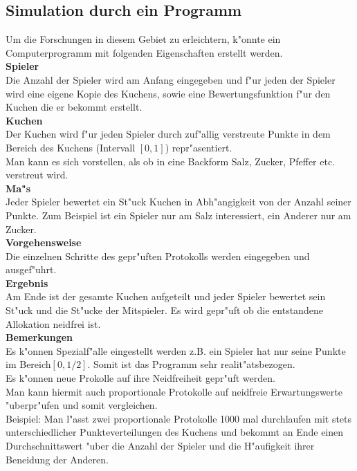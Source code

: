 \documentclass[11pt, a4paper, twoside]{article}
\numberwithin{equation}{section}
\begin{document}
\subsection{Simulation durch ein Programm}
Um die Forschungen in diesem Gebiet zu erleichtern, k"onnte ein Computerprogramm mit folgenden Eigenschaften erstellt werden.\\
\newline
\textbf{Spieler}\\
Die Anzahl der Spieler wird am Anfang eingegeben und f"ur jeden der Spieler wird eine eigene Kopie des Kuchens, sowie eine Bewertungsfunktion f"ur den Kuchen die er bekommt erstellt.\\
\newline
\textbf{Kuchen}\\
Der Kuchen wird f"ur jeden Spieler durch zuf"allig verstreute Punkte in dem Bereich des Kuchens (Intervall $[0,1]$) repr"asentiert.\\ Man kann es sich vorstellen, als ob in eine Backform Salz, Zucker, Pfeffer etc. verstreut wird.\\
\newline 
\textbf{Ma"s}\\
Jeder Spieler bewertet ein St"uck Kuchen in Abh"angigkeit von der Anzahl seiner Punkte. Zum Beispiel ist ein Spieler nur am Salz interessiert, ein Anderer nur am Zucker.\\ 
\newline
\textbf{Vorgehensweise}\\
Die einzelnen Schritte des gepr"uften Protokolls werden eingegeben und ausgef"uhrt.\\
\newline
\textbf{Ergebnis}\\
Am Ende ist der gesamte Kuchen aufgeteilt und jeder Spieler bewertet sein St"uck und die St"ucke der Mitspieler. Es wird gepr"uft ob die entstandene Allokation neidfrei ist.\\
\newline
\textbf{Bemerkungen}\\
Es k"onnen Spezialf"alle eingestellt werden z.B. ein Spieler hat nur seine Punkte im Bereich$[0,1/2]$. Somit ist das Programm sehr realit"atsbezogen.\\
Es k"onnen neue Prokolle auf ihre Neidfreiheit gepr"uft werden.\\
Man kann hiermit auch proportionale Protokolle auf neidfreie Erwartungswerte "uberpr"ufen und somit vergleichen.\\ Beispiel: Man l"asst zwei proportionale Protokolle 1000 mal durchlaufen mit stets unterschiedlicher Punkteverteilungen des Kuchens und bekommt an Ende einen Durchschnittswert "uber die Anzahl der Spieler und die H"aufigkeit ihrer Beneidung der Anderen.\\
\end{document}
